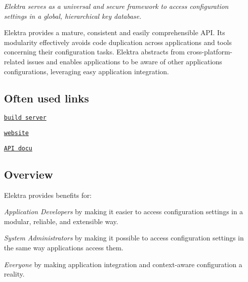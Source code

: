 \href{https://github.com/ElektraInitiative/libelektra/releases/latest}{\tt } \href{https://build.libelektra.org/jenkins/job/libelektra/job/master/lastBuild}{\tt } \href{https://travis-ci.org/ElektraInitiative/libelektra}{\tt } \href{https://cirrus-ci.com/github/ElektraInitiative/libelektra}{\tt } \href{https://coveralls.io/github/ElektraInitiative/libelektra}{\tt }

{\itshape Elektra serves as a universal and secure framework to access configuration settings in a global, hierarchical key database.}



Elektra provides a mature, consistent and easily comprehensible A\+PI. Its modularity effectively avoids code duplication across applications and tools concerning their configuration tasks. Elektra abstracts from cross-\/platform-\/related issues and enables applications to be aware of other applications\textquotesingle{} configurations, leveraging easy application integration.

\subsection*{Often used links}


\begin{DoxyItemize}
\item \href{https://build.libelektra.org/}{\tt build server}
\item \href{https://www.libelektra.org}{\tt website}
\item \href{https://doc.libelektra.org/api/latest/html/}{\tt A\+PI docu}
\end{DoxyItemize}

\subsection*{Overview}

Elektra provides benefits for\+:


\begin{DoxyEnumerate}
\item {\itshape Application Developers} by making it easier to access configuration settings in a modular, reliable, and extensible way.
\item {\itshape System Administrators} by making it possible to access configuration settings in the same way applications access them.
\item {\itshape Everyone} by making application integration and context-\/aware configuration a reality.
\end{DoxyEnumerate}

